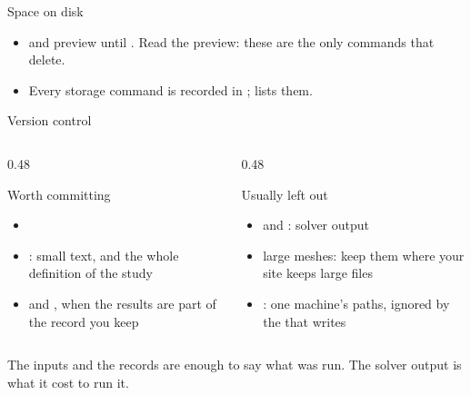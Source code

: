 \begin{frame}{Space on disk}
\vspace{2mm}
\begin{itemize}\small
  \item {} and  preview until
        . Read the preview: these are the only commands that
        delete.
  \item Every storage command is recorded in ;
         lists them.
\end{itemize}
\end{frame}

\begin{frame}{Version control}
\begin{columns}[T]
\begin{column}{0.48\textwidth}
\begin{block}{Worth committing}
\begin{itemize}\small
  \item {}
  \item {}: small text, and the whole definition of the study
  \item {} and , when the results are part of the
        record you keep
\end{itemize}
\end{block}
\end{column}
\begin{column}{0.48\textwidth}
\begin{block}{Usually left out}
\begin{itemize}\small
  \item {} and : solver output
  \item large meshes: keep them where your site keeps large files
  \item {}: one machine's paths, ignored
        by the  that  writes
\end{itemize}
\end{block}
\end{column}
\end{columns}
\begin{takeaway}The inputs and the records are enough to say what was run.
The solver output is what it cost to run it.\end{takeaway}
\end{frame}
